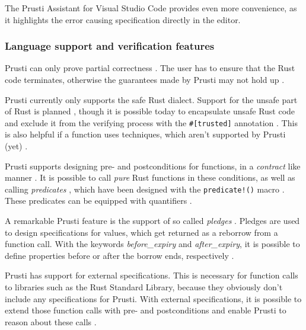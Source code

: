 The Prusti Assistant for Visual Studio Code provides even more convenience, as it highlights the error causing specification directly in the editor.

\subsubsection{Language support and verification features}

Prusti can only prove partial correctness \cite{prusti_user_guide_verification_2023}. The user has to ensure that the Rust code terminates, otherwise the guarantees made by Prusti may not hold up \cite{prusti_user_guide_verification_2023}.

Prusti currently only supports the safe Rust dialect. Support for the unsafe part of Rust is planned \cite{astrauskas_leveraging_2019}, though it is possible today to encapsulate unsafe Rust code and exclude it from the verifying process with the \lstinline{#[trusted]} annotation \cite{prusti_user_guide_trusted_2023}. This is also helpful if a function uses techniques, which aren't supported by Prusti (yet) \cite{prusti_user_guide_trusted_2023}.

Prusti supports designing pre- and postconditions for functions, in a \textit{contract} like manner \cite{deshmukh_prusti_2022, astrauskas_leveraging_2019}. It is possible to call \textit{pure} Rust functions in these conditions, as well as calling \textit{predicates} \cite{prusti_user_guide_predicates_2023}, which have been designed with the \lstinline{predicate!()} macro \cite{deshmukh_prusti_2022}. These predicates can be equipped with quantifiers \cite{deshmukh_prusti_2022}. 

A remarkable Prusti feature is the support of so called \textit{pledges} \cite{astrauskas_leveraging_2019}. Pledges are used to design specifications for values, which get returned as a reborrow from a function call. With the keywords \textit{before\_expiry} and \textit{after\_expiry}, it is possible to define properties before or after the borrow ends, respectively \cite{prusti_user_guide_pledges_2023}.

Prusti has support for external specifications. This is necessary for function calls to libraries such as the Rust Standard Library, because they obviously don't include any specifications for Prusti. With external specifications, it is possible to extend those function calls with pre- and postconditions and enable Prusti to reason about these calls \cite{deshmukh_prusti_2022,prusti_user_guide_external_2023}. 


